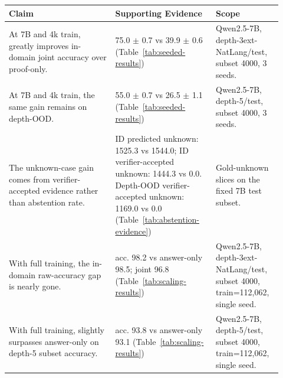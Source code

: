 \begin{tabular}{p{0.36\linewidth}p{0.34\linewidth}p{0.22\linewidth}}
\toprule
Claim & Supporting Evidence & Scope \\
\midrule
At 7B and 4k train, \model{} greatly improves in-domain joint accuracy over proof-only. & 75.0 $\pm$ 0.7 vs 39.9 $\pm$ 0.6 (Table~\ref{tab:seeded-results}) & Qwen2.5-7B, depth-3ext-NatLang/test, subset 4000, 3 seeds. \\
At 7B and 4k train, the same gain remains on depth-OOD. & 55.0 $\pm$ 0.7 vs 26.5 $\pm$ 1.1 (Table~\ref{tab:seeded-results}) & Qwen2.5-7B, depth-5/test, subset 4000, 3 seeds. \\
The unknown-case gain comes from verifier-accepted evidence rather than abstention rate. & ID predicted unknown: 1525.3 vs 1544.0; ID verifier-accepted unknown: 1444.3 vs 0.0. Depth-OOD verifier-accepted unknown: 1169.0 vs 0.0 (Table~\ref{tab:abstention-evidence}) & Gold-unknown slices on the fixed 7B test subset. \\
With full training, the in-domain raw-accuracy gap is nearly gone. & \model{} acc. 98.2 vs answer-only 98.5; \model{} joint 96.8 (Table~\ref{tab:scaling-results}) & Qwen2.5-7B, depth-3ext-NatLang/test, subset 4000, train=112,062, single seed. \\
With full training, \model{} slightly surpasses answer-only on depth-5 subset accuracy. & \model{} acc. 93.8 vs answer-only 93.1 (Table~\ref{tab:scaling-results}) & Qwen2.5-7B, depth-5/test, subset 4000, train=112,062, single seed. \\
\bottomrule
\end{tabular}